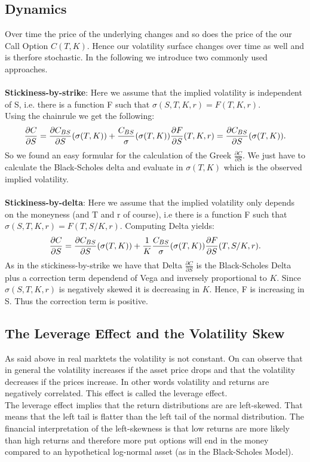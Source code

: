 \subsection{Dynamics}
Over time the price of the underlying changes and so does the price of the our Call Option $C(T,K)$. Hence our volatility surface changes over time as well and is therfore stochastic. In the following we introduce two commonly used approaches.\\\\
\textbf{Stickiness-by-strike}: Here we assume that the implied volatility is independent of S, i.e. there is a function F such that $\sigma(S,T,K,r)=F(T,K,r)$.\\
Using the chainrule we get the following:
$$\frac{\partial C}{\partial S}=\frac{\partial C_{BS}}{\partial S}(\sigma(T,K))+\frac{C_{BS}}{\sigma}(\sigma(T,K))\frac{\partial F}{\partial S}(T,K,r)=\frac{\partial C_{BS}}{\partial S}(\sigma(T,K)).$$
So we found an easy formular for the calculation of the Greek $\frac{\partial C}{\partial S}$. We just have to calculate the Black-Scholes delta and evaluate in $\sigma(T,K)$ which is the observed implied volatility. \\\\
\textbf{Stickiness-by-delta}: Here we assume that the implied volatility only depends on the moneyness (and T and r of course), i.e there is a function F such that $\sigma(S,T,K,r)=F(T,S/K,r)$. Computing Delta yields:
$$\frac{\partial C}{\partial S}=\frac{\partial C_{BS}}{\partial S}(\sigma(T,K))+\frac{1}{K}\frac{C_{BS}}{\sigma}(\sigma(T,K))\frac{\partial F}{\partial S}(T,S/K,r) .$$
As in the stickiness-by-strike we have that Delta $\frac{\partial C}{\partial S}$ is the Black-Scholes Delta plus a correction term dependend of Vega and inversely proportional to $K$. Since $\sigma(S,T,K,r)$ is negatively skewed it is decreasing in $K$. Hence, F is increasing in S. Thus the correction term is positive.\\

\subsection{The Leverage Effect and the Volatility Skew}
As said above in real marktets the volatility is not constant. On can observe that in general the volatility increases if the asset price drops and that the volatility decreases if the prices increase. In other words volatility and returns are negatively correlated. This effect is called the leverage effect.\\
The leverage effect implies that the return distributions are are left-skewed. That means that the left tail is flatter than the left tail of the normal distribution. The financial interpretation of the left-skewness is that low returns are more likely than high returns and therefore more put options will end in the money compared to an hypothetical log-normal asset (as in the Black-Scholes Model).